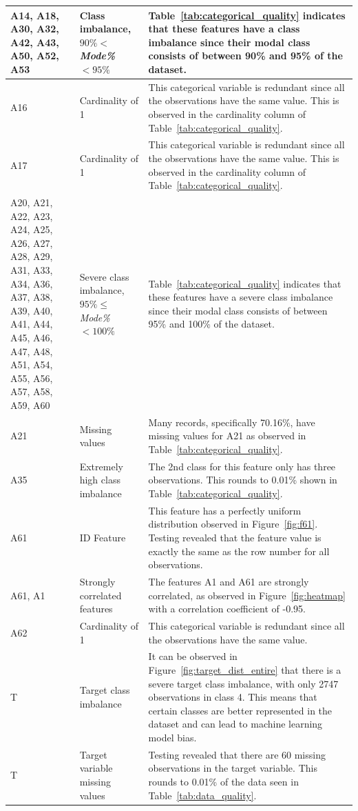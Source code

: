 \documentclass[11pt]{article}
\begin{document}
\begin{longtable}{|p{1.7cm}|p{4cm}|p{8cm}|}
	A14, A18, A30, A32, A42, A43, A50, A52, A53 & Class imbalance, $90\%<$\textit{Mode\%} $< 95\%$ & Table~\ref{tab:categorical_quality} indicates that these features have a class imbalance since their modal class consists of between 90\% and 95\% of the dataset. \\
	\hline
	A16 & Cardinality of 1 & This categorical variable is redundant since all the observations have the same value. This is observed in the cardinality column of Table~\ref{tab:categorical_quality}. \\
	\hline
	A17 & Cardinality of 1 & This categorical variable is redundant since all the observations have the same value. This is observed in the cardinality column of Table~\ref{tab:categorical_quality}. \\
	\hline
	A20, A21, A22, A23, A24, A25, A26, A27, A28, A29, A31, A33, A34, A36, A37, A38, A39, A40, A41, A44, A45, A46, A47, A48, A51, A54, A55, A56, A57, A58, A59, A60 & Severe class imbalance, $95\%\le$\textit{Mode\%} $< 100\%$ & Table~\ref{tab:categorical_quality} indicates that these features have a severe class imbalance since their modal class consists of between 95\% and 100\% of the dataset. \\
	\hline
	A21 & Missing values & Many records, specifically 70.16\%, have missing values for A21 as observed in Table~\ref{tab:categorical_quality}. \\
	\hline
	A35 & Extremely high class imbalance& The 2nd class for this feature only has three observations. This rounds to 0.01\% shown in Table~\ref{tab:categorical_quality}. \\
	\hline
	A61 & ID Feature & This feature has a perfectly uniform distribution observed in Figure~\ref{fig:f61}. Testing revealed that the feature value is exactly the same as the row number for all observations. \\
	\hline
	A61, A1 & Strongly correlated features & The features A1 and A61 are strongly correlated, as observed in Figure~\ref{fig:heatmap} with a correlation coefficient of -0.95. \\
	\hline
	A62 & Cardinality of 1 & This categorical variable is redundant since all the observations have the same value. \\
	\hline
	T & Target class imbalance &  It can be observed in Figure~\ref{fig:target_dist_entire} that there is a severe target class imbalance, with only 2747 observations in class 4.  This means that certain classes are better represented in the dataset and can lead to machine learning model bias. \\
	\hline
	T & Target variable missing values & Testing revealed that there are 60 missing observations in the target variable. This rounds to 0.01\% of the data seen in Table~\ref{tab:data_quality}.\\
	\hline
\end{longtable}
\end{document}

